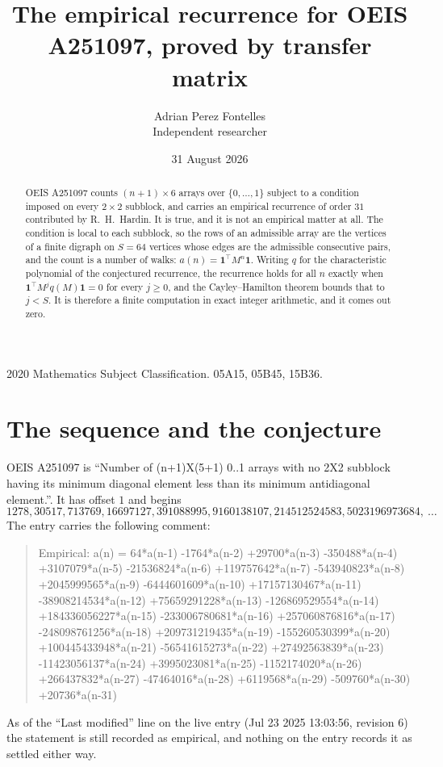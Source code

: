 \documentclass[11pt,a4paper]{article}
\title{The empirical recurrence for OEIS A251097, proved by transfer matrix}
\author{Adrian Perez Fontelles\\ \small Independent researcher}
\date{31 August 2026}
\theoremstyle{plain}
\theoremstyle{definition}
\begin{document}
\maketitle

\begin{abstract}
OEIS A251097 counts $(n+1)\times6$ arrays over $\{0,\dots,1\}$ subject to a condition imposed on
every $2\times2$ subblock, and carries an empirical recurrence of order $31$ contributed
by R.~H.~Hardin. It is true, and it is not an empirical matter at all. The condition is local
to each subblock, so the rows of an admissible array are the vertices of a finite digraph
on $S=64$ vertices whose edges are the admissible consecutive pairs, and the count is a
number of walks: $a(n)=\mathbf{1}^{\!\top}M^{n}\mathbf{1}$. Writing $q$
for the characteristic polynomial of the conjectured recurrence, the recurrence holds for all
$n$ exactly when $\mathbf{1}^{\!\top}M^{j}q(M)\mathbf{1}=0$ for every $j\ge0$, and the
Cayley--Hamilton theorem bounds that to $j<S$. It is therefore a finite computation in exact
integer arithmetic, and it comes out zero.
\end{abstract}

\noindent\small 2020 Mathematics Subject Classification. 05A15, 05B45, 15B36.\normalsize

\section{The sequence and the conjecture}

OEIS A251097 is ``Number of (n+1)X(5+1) 0..1 arrays with no 2X2 subblock having its minimum diagonal element less than its minimum antidiagonal element.''. It has offset $1$ and begins
\[
1278, 30517, 713769, 16697127, 391088995, 9160138107, 214512524583, 5023196973684,\ \dots
\]
The entry carries the following comment:
\begin{quote}\small
Empirical: a(n) = 64*a(n-1) -1764*a(n-2) +29700*a(n-3) -350488*a(n-4) +3107079*a(n-5) -21536824*a(n-6) +119757642*a(n-7) -543940823*a(n-8) +2045999565*a(n-9) -6444601609*a(n-10) +17157130467*a(n-11) -38908214534*a(n-12) +75659291228*a(n-13) -126869529554*a(n-14) +184336056227*a(n-15) -233006780681*a(n-16) +257060876816*a(n-17) -248098761256*a(n-18) +209731219435*a(n-19) -155260530399*a(n-20) +100445433948*a(n-21) -56541615273*a(n-22) +27492563839*a(n-23) -11423056137*a(n-24) +3995023081*a(n-25) -1152174020*a(n-26) +266437832*a(n-27) -47464016*a(n-28) +6119568*a(n-29) -509760*a(n-30) +20736*a(n-31)
\end{quote}
As of the ``Last modified'' line on the live entry (Jul 23 2025 13:03:56, revision 6) the statement is
still recorded as empirical, and nothing on the entry records it as settled either way.
\end{document}
